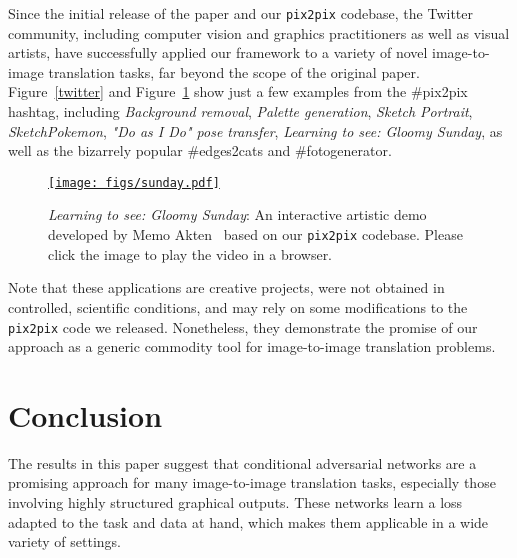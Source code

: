 \documentclass[10pt,twocolumn,letterpaper]{article}
\begin{document}
Since the initial release of the paper and our {\tt pix2pix} codebase, the Twitter community, including computer vision and graphics practitioners as well as visual artists, have successfully applied our framework to a variety of novel image-to-image translation tasks, far beyond the scope of the original paper.  Figure~\ref{twitter} and Figure~\ref{sunday}  show just a few examples from the \#pix2pix hashtag, including \emph{Background removal}, \emph{Palette generation}, \emph{Sketch  Portrait}, \emph{SketchPokemon}, \emph{"Do as I Do" pose transfer}, \emph{Learning to see: Gloomy Sunday}, as well as the bizarrely popular \#edges2cats and \#fotogenerator.
\begin{figure}[h]
\centering
    \href{https://vimeo.com/260612034}{\texttt{[image: figs/sunday.pdf]}}
    \vspace{-0.1in}
    \caption{\emph{Learning to see: Gloomy Sunday}: An interactive artistic demo developed by Memo Akten~\cite{sunday} based on our {\tt pix2pix} codebase. Please click the image to play the video in a browser.}
    \label{sunday}
    \vspace{-0.2in}
\end{figure}
Note that these applications are creative projects, were not obtained in controlled, scientific conditions, and may rely on some modifications to the {\tt pix2pix} code we released. Nonetheless, they demonstrate the promise of our approach as a generic commodity tool for image-to-image translation problems.


\vspace{-0.06in}

\section{Conclusion}
The results in this paper suggest that conditional adversarial networks are a promising approach for many image-to-image translation tasks, especially those involving highly structured graphical outputs. These networks learn a loss adapted to the task and data at hand, which makes them applicable in a wide variety of settings.

\vspace{-0.06in}
\end{document}
